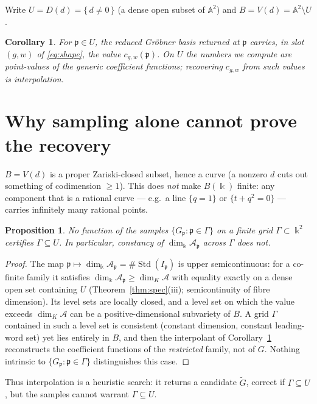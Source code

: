 \documentclass[11pt]{article}
\newtheorem{proposition}[theorem]{Proposition}
\newtheorem{corollary}[theorem]{Corollary}
\theoremstyle{definition}
\newcommand{\kk}{\Bbbk}
\newcommand{\A}{\mathcal{A}}
\newcommand{\Std}{\operatorname{Std}}
\newcommand{\pp}{\mathfrak{p}}
\begin{document}
Write $U=D(d)=\{\,d\neq0\,\}$ (a dense open subset of $\mathbb{A}^2$) and $B=V(d)=\mathbb{A}^2\setminus U$.

\begin{corollary}\label{cor:values}
For $\pp\in U$, the reduced Gr\"obner basis returned at $\pp$ carries, in slot $(g,w)$ of
\eqref{eq:shape}, the value $c_{g,w}(\pp)$. On $U$ the numbers we compute are point-values of the
generic coefficient functions; recovering $c_{g,w}$ from such values is interpolation.
\end{corollary}

\section{Why sampling alone cannot prove the recovery}

$B=V(d)$ is a proper Zariski-closed subset, hence a curve (a nonzero $d$ cuts out something of
codimension $\geq1$). This does \emph{not} make $B(\kk)$ finite: any component that is a rational
curve --- e.g.\ a line $\{q=1\}$ or $\{t+q^2=0\}$ --- carries infinitely many rational points.

\begin{proposition}\label{prop:gap}
No function of the samples $\{G_\pp:\pp\in\Gamma\}$ on a finite grid $\Gamma\subset\kk^2$ certifies
$\Gamma\subseteq U$. In particular, constancy of $\dim_\kk\A_\pp$ across $\Gamma$ does not.
\end{proposition}

\begin{proof}
The map $\pp\mapsto\dim_\kk\A_\pp=\#\Std(I_\pp)$ is upper semicontinuous: for a co-finite family it
satisfies $\dim_\kk\A_\pp\ge\dim_K\A$ with equality exactly on a dense open set containing $U$
(Theorem~\ref{thm:spec}(iii); semicontinuity of fibre dimension). Its level sets are locally closed,
and a level set on which the value exceeds $\dim_K\A$ can be a positive-dimensional subvariety of
$B$. A grid $\Gamma$ contained in such a level set is consistent (constant dimension, constant
leading-word set) yet lies entirely in $B$, and then the interpolant of
Corollary~\ref{cor:values} reconstructs the coefficient functions of the \emph{restricted} family,
not of $G$. Nothing intrinsic to $\{G_\pp:\pp\in\Gamma\}$ distinguishes this case.
\end{proof}

Thus interpolation is a heuristic search: it returns a candidate $\widetilde G$, correct
if $\Gamma\subseteq U$, but the samples cannot warrant $\Gamma\subseteq U$.
\end{document}
